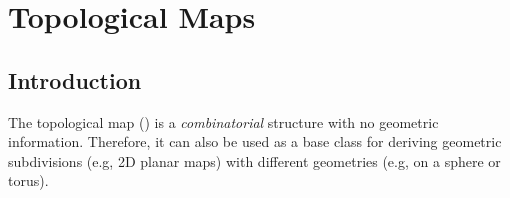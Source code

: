 
\def\Ipe#1{\def\IPEfile{#1}}

\renewcommand{\Re}{{\rm I\!\hspace{-0.025em} R}}
\newcommand{\normal}[1]{\eta_{#1}}
\newenvironment{dfn}{{\vspace*{1ex} \noindent \bf Definition }}{\vspace*{1ex}}
\newcommand{\bigdef}[2]{\index{#1}\begin{dfn} {\rm #2} \end{dfn}}
\newenvironment{proof}{{\em Proof:}}{\hfill{\hfill\rule{2mm}{2mm}}}

\newcommand{\comment}[1]{{\sf * #1 *}}
\newcommand{\ncomment}[1]{\noindent {\sf * #1 * }}

\newcommand{\intsupplanes}{P} 
\def\C{{\cal C}}
\def\G{{\cal G}}
\def\F{{\cal F}}
\def\I{{\cal I}}
\def\U{{\cal U}}
\def\M{{\cal M}}
\def\eps{{\varepsilon}}
\def\bd{{\partial}}
\def\dm{{\cal D}}
\newcommand{\Section}[1]{Section~{\protect\ref{#1}}}
\newcommand{\Chapter}[1]{Chapter~{\protect\ref{#1}}}

\ccParDims

\chapter{Topological Maps}
\label{I1_ChapterTopologicalMap}
\minitoc

\section{Introduction}
\label{TPM_sec:intro}
   The topological map () is a {\em
   combinatorial} structure with no geometric information. Therefore,
   it can also be used as a base class for deriving geometric
   subdivisions (e.g, 2D planar maps) with different geometries (e.g,
   on a sphere or torus). 

